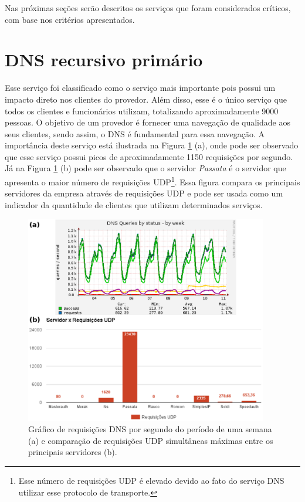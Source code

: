 Nas próximas seções serão descritos os serviços que foram considerados críticos, com base nos critérios apresentados.

\section{DNS recursivo primário}
\label{section:dnsrecprim}

Esse serviço foi classificado como o serviço mais importante pois possui um impacto direto nos clientes do provedor. Além disso, esse é o único 
serviço que todos os clientes e funcionários utilizam, totalizando aproximadamente 9000 pessoas. O objetivo de um provedor é fornecer uma navegação 
de qualidade aos seus clientes, sendo assim, o \ac{DNS} é fundamental para essa navegação. A importância deste serviço está ilustrada na Figura 
\ref{fig:dns_udp} (a), onde pode ser observado que esse serviço possui picos de aproximadamente 1150 requisições por segundo. Já na Figura 
\ref{fig:dns_udp} (b) pode ser observado que o servidor \textit{Passata} é o servidor que apresenta o maior número de requisições 
\ac{UDP}\footnote[1]{Esse número de requisições \ac{UDP} é elevado devido ao fato do serviço \ac{DNS} utilizar esse protocolo de transporte.}. 
Essa figura compara os principais servidores da empresa através de requisições \ac{UDP} e pode ser usada como um indicador da quantidade de 
clientes que utilizam determinados serviços.

\begin{figure}[h!]
 \centering
 \includegraphics[width=400px]{img/dns_udp.eps}
 \caption{Gráfico de requisições DNS por segundo do período de uma semana (a) e comparação de requisições UDP simultâneas máximas entre 
 os principais servidores (b).}
 \label{fig:dns_udp}
\end{figure}

